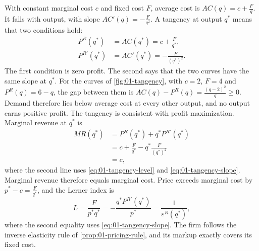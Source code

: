 With constant marginal cost $c$ and fixed cost $F$, average cost is $AC(q) = c + \frac{F}{q}$. It falls with
output, with slope $AC'(q) = -\frac{F}{q^2}$. A tangency at output $q^*$ means that two conditions hold:
\begin{align}
  P^R(q^*) &= AC(q^*) = c + \frac{F}{q^*}, \label{eq:01-tangency-level}\\
  P^{R\prime}(q^*) &= AC'(q^*) = -\frac{F}{(q^*)^2}. \label{eq:01-tangency-slope}
\end{align}
The first condition is zero profit. The second says that the two curves have the same slope at $q^*$. For the
curves of \cref{fig:01-tangency}, with $c = 2$, $F = 4$ and $P^R(q) = 6 - q$, the gap between them is
$AC(q) - P^R(q) = \frac{(q - 2)^2}{q} \ge 0$. Demand therefore lies below average cost at every other output,
and no output earns positive profit. The tangency is consistent with profit maximization. Marginal revenue at
$q^*$ is
\begin{align*}
  MR(q^*) &= P^R(q^*) + q^* P^{R\prime}(q^*) \\
  &= c + \frac{F}{q^*} - q^* \frac{F}{(q^*)^2} \\
  &= c ,
\end{align*}
where the second line uses \eqref{eq:01-tangency-level} and \eqref{eq:01-tangency-slope}. Marginal revenue
therefore equals marginal cost. Price exceeds marginal cost by $p^* - c = \frac{F}{q^*}$, and the Lerner index
is
\[
  L = \frac{F}{p^* q^*} = -\frac{q^* P^{R\prime}(q^*)}{p^*} = \frac{1}{\varepsilon^R(q^*)} ,
\]
where the second equality uses \eqref{eq:01-tangency-slope}. The firm follows the inverse elasticity rule of
\cref{prop:01-pricing-rule}, and its markup exactly covers its fixed cost.

